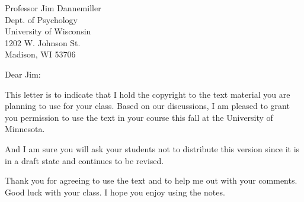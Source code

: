

\vspace{0.6in}

Professor Jim Dannemiller \\
Dept. of Psychology \\
University of Wisconsin \\
1202 W. Johnson St. \\
Madison, WI 53706

\mydate

Dear Jim:

This letter is to indicate that I hold the copyright to the text
material you are planning to use for your class.  Based on our
discussions, I am pleased to grant you permission to use the text in
your course this fall at the University of Minnesota.

And I am sure you will ask your students not to distribute this
version since it is in a draft state and continues to be revised.

Thank you for agreeing to use the text and to help me out with your
comments.  Good luck with your class.  I hope you enjoy using the
notes.


